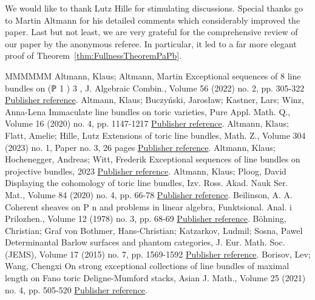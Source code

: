 \documentclass[11pt]{article}
\theoremstyle{definition}
\providecommand{\longthanks}[1]{\par\smallskip\noindent #1\par\smallskip}
\numberwithin{equation}{section}
\begin{document}
\longthanks{We would like to thank 
Lutz Hille for stimulating discussions.
Special thanks go to Martin Altmann for his detailed 
comments which considerably improved the paper.
Last but not least, we are very grateful for the 
comprehensive review of our paper by the anonymous referee.
In particular, it led to a far more elegant proof 
of Theorem~\ref{thm:FullnessTheoremPaPb}.}
\begin{thebibliography}{MMMMMM}
 Altmann, Klaus; Altmann, Martin Exceptional sequences of 8 line bundles on (ℙ 1 ) 3 , J. Algebraic Combin., Volume 56 (2022) no. 2, pp. 305-322 \href{https://alco.centre-mersenne.org/articles/10.5802/alco.371/#p1p1p1}{Publisher reference}.
 Altmann, Klaus; Buczyński, Jarosław; Kastner, Lars; Winz, Anna-Lena Immaculate line bundles on toric varieties, Pure Appl. Math. Q., Volume 16 (2020) no. 4, pp. 1147-1217 \href{https://alco.centre-mersenne.org/articles/10.5802/alco.371/#immaculate}{Publisher reference}.
 Altmann, Klaus; Flatt, Amelie; Hille, Lutz Extensions of toric line bundles, Math. Z., Volume 304 (2023) no. 1, Paper no. 3, 26 pages \href{https://alco.centre-mersenne.org/articles/10.5802/alco.371/#displayingExt}{Publisher reference}.
 Altmann, Klaus; Hochenegger, Andreas; Witt, Frederik Exceptional sequences of line bundles on projective bundles, 2023 \href{https://alco.centre-mersenne.org/articles/10.5802/alco.371/#exsec}{Publisher reference}.
 Altmann, Klaus; Ploog, David Displaying the cohomology of toric line bundles, Izv. Ross. Akad. Nauk Ser. Mat., Volume 84 (2020) no. 4, pp. 66-78 \href{https://alco.centre-mersenne.org/articles/10.5802/alco.371/#dop}{Publisher reference}.
 Beĭlinson, A. A. Coherent sheaves on P n  and problems in linear algebra, Funktsional. Anal. i Prilozhen., Volume 12 (1978) no. 3, pp. 68-69 \href{https://alco.centre-mersenne.org/articles/10.5802/alco.371/#beilinson}{Publisher reference}.
 Böhning, Christian; Graf von Bothmer, Hans-Christian; Katzarkov, Ludmil; Sosna, Pawel Determinantal Barlow surfaces and phantom categories, J. Eur. Math. Soc. (JEMS), Volume 17 (2015) no. 7, pp. 1569-1592 \href{https://alco.centre-mersenne.org/articles/10.5802/alco.371/#Phantom}{Publisher reference}.
 Borisov, Lev; Wang, Chengxi On strong exceptional collections of line bundles of maximal length on Fano toric Deligne-Mumford stacks, Asian J. Math., Volume 25 (2021) no. 4, pp. 505-520 \href{https://alco.centre-mersenne.org/articles/10.5802/alco.371/#BorisovWang}{Publisher reference}.

\end{thebibliography}
\end{document}
